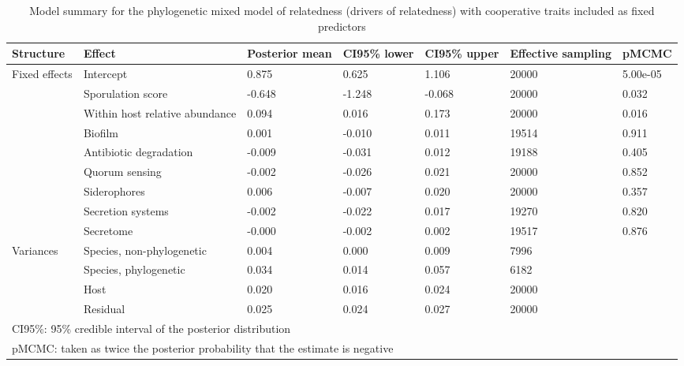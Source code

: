 \begin{table}

\caption{\label{tab:}Model summary for the phylogenetic mixed model of relatedness (drivers of relatedness) with cooperative traits included as fixed predictors}
\centering
\begin{tabular}[t]{lllllll}
\toprule
Structure & Effect & Posterior
 mean & CI95\% lower & CI95\% upper & Effective
 sampling & pMCMC\\
\midrule
Fixed effects & Intercept & 0.875 & 0.625 & 1.106 & 20000 & 5.00e-05\\
 & Sporulation score & -0.648 & -1.248 & -0.068 & 20000 & 0.032\\
 & Within host relative abundance & 0.094 & 0.016 & 0.173 & 20000 & 0.016\\
 & Biofilm & 0.001 & -0.010 & 0.011 & 19514 & 0.911\\
 & Antibiotic degradation & -0.009 & -0.031 & 0.012 & 19188 & 0.405\\
 & Quorum sensing & -0.002 & -0.026 & 0.021 & 20000 & 0.852\\
 & Siderophores & 0.006 & -0.007 & 0.020 & 20000 & 0.357\\
 & Secretion systems & -0.002 & -0.022 & 0.017 & 19270 & 0.820\\
 & Secretome & -0.000 & -0.002 & 0.002 & 19517 & 0.876\\
Variances & Species, non-phylogenetic & 0.004 & 0.000 & 0.009 & 7996 & \\
 & Species, phylogenetic & 0.034 & 0.014 & 0.057 & 6182 & \\
 & Host & 0.020 & 0.016 & 0.024 & 20000 & \\
 & Residual & 0.025 & 0.024 & 0.027 & 20000 & \\
\bottomrule
\multicolumn{7}{l}{CI95\%: 95\% credible interval of the posterior distribution}\\
\multicolumn{7}{l}{pMCMC: taken as twice the posterior probability that the estimate is negative}\\
\end{tabular}
\end{table}
